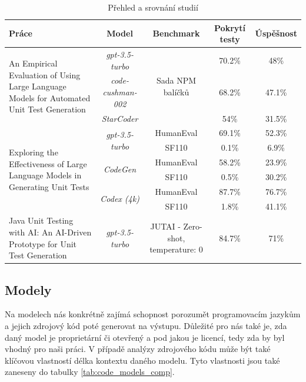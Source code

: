 \documentclass[czech, ma, kiv, he, iso690numb, pdf, viewonly]{fasthesis}
\begin{document}
    \newpage

    \begin{landscape}
            \vspace*{\fill}
            \begin{table}[H]
                \begin{tabular}{|p{6cm}|c|c|c|c|}
                    \hline
                    \textbf{Práce} & \textbf{Model} & \textbf{Benchmark} & \textbf{Pokrytí testy} & \textbf{Úspěšnost} \\
                    \hline
                    \multirow{3}{6cm}{An Empirical Evaluation of Using Large Language Models for Automated Unit Test Generation} & \textit{gpt-3.5-turbo} & \multirow{3}{*}{Sada NPM balíčků} & 70.2\% & 48\% \\
                     & \textit{code-cushman-002} & & 68.2\% & 47.1\% \\
                     & \textit{StarCoder} & & 54\% & 31.5\% \\
                    \hline
                    \multirow{6}{6cm}{Exploring the Effectiveness of Large Language
Models in Generating Unit Tests} & \multirow{2}{*}{\textit{gpt-3.5-turbo}} & HumanEval & 69.1\% & 52.3\% \\
                     & & SF110 & 0.1\% & 6.9\% \\
                     & \multirow{2}{*}{\textit{CodeGen}} & HumanEval & 58.2\% & 23.9\% \\
                     & & SF110 & 0.5\% & 30.2\% \\
                     & \multirow{2}{*}{\textit{Codex (4k)}} & HumanEval & 87.7\% & 76.7\% \\
                     & & SF110 & 1.8\% & 41.1\% \\
                    \hline
                    Java Unit Testing with AI: An AI-Driven Prototype for Unit Test Generation & \textit{gpt-3.5-turbo} & JUTAI - Zero-shot, temperature: \(0\) & 84.7\% & 71\% \\
                    \hline
                \end{tabular}
                \centering
                \caption{Přehled a srovnání studií}
                \label{tab:paper_comp}
            \end{table}
            \vspace*{\fill}
    \end{landscape}

    \subsection{Modely} \label{sec:research_models}
    Na  modelech nás konkrétně zajímá schopnost porozumět programovacím jazykům a jejich zdrojový kód poté generovat na výstupu. Důležité pro nás také je, zda daný model je proprietární či otevřený a pod jakou je licencí, tedy zda by byl vhodný pro naši práci. V případě analýzy zdrojového kódu může být také klíčovou vlastností délka kontextu daného modelu. Tyto vlastnosti jsou také zaneseny do tabulky \ref{tab:code_models_comp}.
\end{document}
